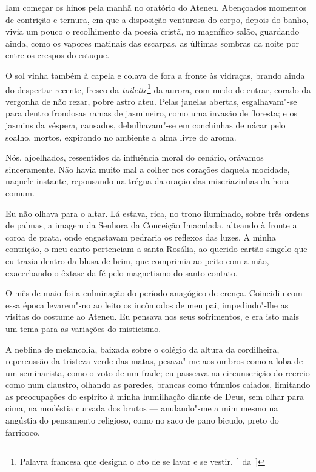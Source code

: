 Iam começar os hinos pela manhã no oratório do Ateneu.
Abençoados momentos de contrição e ternura, em que a disposição
venturosa do corpo, depois do banho, vivia um pouco o recolhimento da
poesia cristã, no magnífico salão, guardando ainda, como os vapores
matinais das escarpas, as últimas sombras da noite por entre os crespos
do estuque. 

O sol vinha também à capela e colava de fora a fronte às
vidraças, brando ainda do despertar recente, fresco da \textit{toilette}\footnote{ Palavra francesa 
que designa o ato de se lavar e se vestir. [~da~]} da
aurora, com medo de entrar, corado da vergonha de não rezar, pobre
astro ateu. Pelas janelas abertas, esgalhavam"-se para dentro
frondosas ramas de jasmineiro, como uma invasão de floresta; e os
jasmins da véspera, cansados, debulhavam"-se em conchinhas de nácar
pelo soalho, mortos, expirando no ambiente a alma livre do aroma. 


Nós, ajoelhados, ressentidos da influência moral do cenário, orávamos
sinceramente. Não havia muito mal a colher nos corações daquela
mocidade, naquele instante, repousando na trégua da oração das
miseriazinhas da hora comum. 

Eu não olhava para o altar. Lá estava,
rica, no trono iluminado, sobre três ordens de palmas, a imagem da
Senhora da Conceição Imaculada, alteando à fronte a coroa de prata,
onde engastavam pedraria os reflexos das luzes. A minha contrição, o
meu canto pertenciam a santa Rosália, ao querido cartão singelo que eu
trazia dentro da blusa de brim, que comprimia ao peito com a mão,
exacerbando o êxtase da fé pelo magnetismo do santo contato. 

O mês de maio foi a culminação do período anagógico de crença. Coincidiu com
essa época levarem"-no ao leito os incômodos de meu pai,
impedindo"-lhe as visitas do costume ao Ateneu. Eu pensava nos seus
sofrimentos, e era isto mais um tema para as variações do misticismo.

A neblina de melancolia, baixada sobre o colégio da altura da
cordilheira, repercussão da tristeza verde das matas, pesava"-me aos
ombros como a loba de um seminarista, como o voto de um frade; eu
passeava na circunscrição do recreio como num claustro, olhando as
paredes, brancas como túmulos caiados, limitando as preocupações do
espírito à minha humilhação diante de Deus, sem olhar para cima, na
modéstia curvada dos brutos --- anulando"-me a mim mesmo na angústia
do pensamento religioso, como no saco de pano bicudo, preto do farricoco. 

